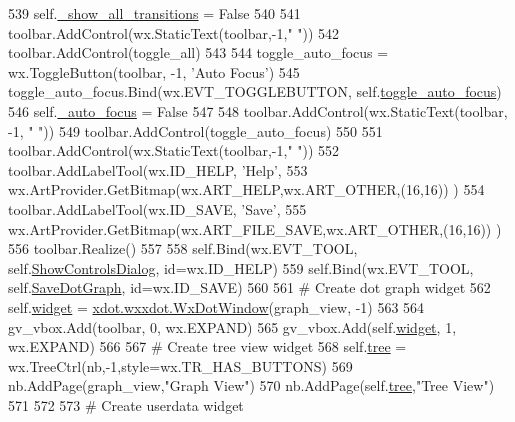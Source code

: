 \begin{DoxyCode}
539         self.\hyperlink{classsmacc__viewer_1_1SmaccViewerFrame_adf4d6790cc3c124fd01509f6798eeb57}{\_show\_all\_transitions} = \textcolor{keyword}{False}
540 
541         toolbar.AddControl(wx.StaticText(toolbar,-1,\textcolor{stringliteral}{"    "}))
542         toolbar.AddControl(toggle\_all)
543 
544         toggle\_auto\_focus = wx.ToggleButton(toolbar, -1, \textcolor{stringliteral}{'Auto Focus'})
545         toggle\_auto\_focus.Bind(wx.EVT\_TOGGLEBUTTON, self.\hyperlink{classsmacc__viewer_1_1SmaccViewerFrame_a6ca9f14ae1b5d6f1ebac05575536255b}{toggle\_auto\_focus})
546         self.\hyperlink{classsmacc__viewer_1_1SmaccViewerFrame_a733f65cc99ce9d6effae5c6a87be4989}{\_auto\_focus} = \textcolor{keyword}{False}
547 
548         toolbar.AddControl(wx.StaticText(toolbar, -1, \textcolor{stringliteral}{"    "}))
549         toolbar.AddControl(toggle\_auto\_focus)
550 
551         toolbar.AddControl(wx.StaticText(toolbar,-1,\textcolor{stringliteral}{"    "}))
552         toolbar.AddLabelTool(wx.ID\_HELP, \textcolor{stringliteral}{'Help'},
553                 wx.ArtProvider.GetBitmap(wx.ART\_HELP,wx.ART\_OTHER,(16,16)) )
554         toolbar.AddLabelTool(wx.ID\_SAVE, \textcolor{stringliteral}{'Save'},
555                 wx.ArtProvider.GetBitmap(wx.ART\_FILE\_SAVE,wx.ART\_OTHER,(16,16)) )
556         toolbar.Realize()
557 
558         self.Bind(wx.EVT\_TOOL, self.\hyperlink{classsmacc__viewer_1_1SmaccViewerFrame_a2a8cf7684b6a1ead537056e9e24e6340}{ShowControlsDialog}, id=wx.ID\_HELP)
559         self.Bind(wx.EVT\_TOOL, self.\hyperlink{classsmacc__viewer_1_1SmaccViewerFrame_a1c2e0e8907a1600a3a60fa5cd556bf99}{SaveDotGraph}, id=wx.ID\_SAVE)
560 
561         \textcolor{comment}{# Create dot graph widget}
562         self.\hyperlink{classsmacc__viewer_1_1SmaccViewerFrame_a18de3813fb0bf9d3c5a4315174be3761}{widget} = \hyperlink{classsmacc__viewer_1_1xdot_1_1wxxdot_1_1WxDotWindow}{xdot.wxxdot.WxDotWindow}(graph\_view, -1)
563 
564         gv\_vbox.Add(toolbar, 0, wx.EXPAND)
565         gv\_vbox.Add(self.\hyperlink{classsmacc__viewer_1_1SmaccViewerFrame_a18de3813fb0bf9d3c5a4315174be3761}{widget}, 1, wx.EXPAND)
566 
567         \textcolor{comment}{# Create tree view widget}
568         self.\hyperlink{classsmacc__viewer_1_1SmaccViewerFrame_acb413cad9d12ad71bbb44e26ff9149fd}{tree} = wx.TreeCtrl(nb,-1,style=wx.TR\_HAS\_BUTTONS)
569         nb.AddPage(graph\_view,\textcolor{stringliteral}{"Graph View"})
570         nb.AddPage(self.\hyperlink{classsmacc__viewer_1_1SmaccViewerFrame_acb413cad9d12ad71bbb44e26ff9149fd}{tree},\textcolor{stringliteral}{"Tree View"})
571 
572 
573         \textcolor{comment}{# Create userdata widget}

\end{DoxyCode}
